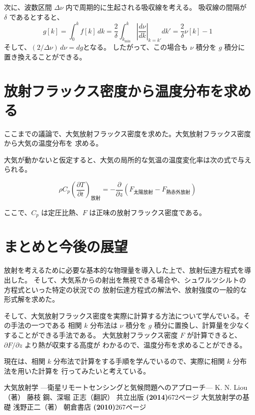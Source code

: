 \documentclass[article,twoside]{dennou777}
\begin{document}
次に、波数区間 $\Delta\nu$ 内で周期的に生起される吸収線を考える。
吸収線の間隔が $\delta$ であるとすると、
\begin{equation}
	g[k]=\int^k_0 f[k]\,dk
	=\frac{2}{\delta}\int^k_{k_{\mathrm{min}}}\left|\frac{d\nu}{dk}\right|_{k=k'}dk'
	=\frac{2}{\delta}\nu[k]-1
\end{equation}
そして、$(2/\Delta\nu)\,d\nu=dg$となる。
したがって、この場合も $\nu$ 積分を $g$ 積分に置き換えることができる。

\section{放射フラックス密度から温度分布を求める}
ここまでの議論で、大気放射フラックス密度を求めた。大気放射フラックス密度から大気の温度分布を
求める。

大気が動かないと仮定すると、大気の局所的な気温の温度変化率は次の式で与えられる。

\begin{equation}
	\rho C_p\left(\frac{\partial T}{\partial t}\right)_\text{放射}
	=-\frac{\partial}{\partial z}(F_\text{太陽放射}-F_\text{熱赤外放射})
\end{equation}

ここで、$C_p$ は定圧比熱、$F$ は正味の放射フラックス密度である。

\section{まとめと今後の展望}

放射を考えるために必要な基本的な物理量を導入した上で、放射伝達方程式を導出した。
そして、大気系からの射出を無視できる場合や、シュワルツシルトの方程式といった特定の状況での
放射伝達方程式の解法や、放射強度の一般的な形式解を求めた。

そして、大気放射フラックス密度を実際に計算する方法について学んでいる。その手法の一つである
相関 $k$ 分布法は $\nu$ 積分を $g$ 積分に置換し、計算量を少なくすることができる手法である。
大気放射フラックス密度 $F$ が計算できると、$\partial F/\partial z$ より熱が収束する高度が
わかるので、温度分布を求めることができる。

現在は、相関 $k$ 分布法で計算をする手順を学んでいるので、実際に相関 $k$ 分布法を用いた計算を
行ってみたいと考えている。

\clearpage
\begin{thebibliography}{9}
	 大気放射学 ---衛星リモートセンシングと気候問題へのアプローチ---
		K. N. Liou（著） 藤枝 鋼、深堀 正志（翻訳）
		共立出版 \textbf{(2014)}\quad672ページ
	 大気放射学の基礎 浅野正二（著） 朝倉書店 \textbf{(2010)}\quad267ページ
\end{thebibliography}

\pagebreak
\listoffigures
\listoftables
\end{document}
